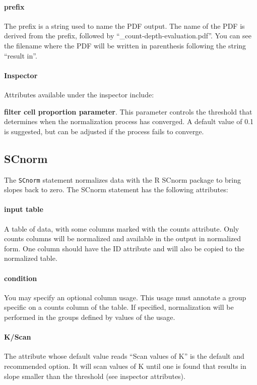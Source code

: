 \paragraph{prefix}
The prefix is a string used to name the PDF output. The name of the PDF is derived from the prefix, followed by ``\_count-depth-evaluation.pdf''. You can see the filename where the PDF will be written in parenthesis following the string ``result in''.
\paragraph{Inspector}
Attributes available under the inspector include:

\textbf{filter cell proportion parameter}. This parameter controls the threshold that determines when the normalization process has converged. A default value of 0.1 is suggested, but can be adjusted if the process fails to converge.

\subsection{SCnorm}
The \texttt{SCnorm} statement  normalizes data with the R SCnorm package to bring slopes back to zero. The SCnorm statement has the following attributes:
\paragraph{input table}
A table of data, with some columns marked with the counts attribute. Only counts columns will be normalized and available in the output in normalized form. One column should have the ID attribute and will also be copied to the normalized table.

\paragraph{condition}
You may specify an optional column usage. This usage must annotate a group specific on a counts column of the table. If specified, normalization will be performed in the groups defined by values of the usage.
\paragraph{K/Scan}
The attribute whose default value reads ``Scan values of K'' is the default and recommended option. It will scan values of K until one is found that results in slope smaller than the threshold (see inspector attributes).

